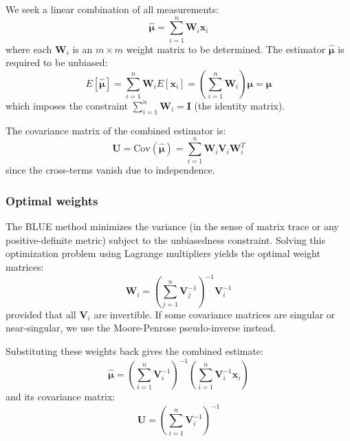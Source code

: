 We seek a linear combination of all measurements:
\begin{equation}
    \hat{\boldsymbol{\mu}} = \sum_{i=1}^{n} \mathbf{W}_i \mathbf{x}_i
\end{equation}
where each $\mathbf{W}_i$ is an $m \times m$ weight matrix to be determined. The estimator $\hat{\boldsymbol{\mu}}$ is required to be unbiased:
\begin{equation}
    E[\hat{\boldsymbol{\mu}}] = \sum_{i=1}^{n} \mathbf{W}_i E[\mathbf{x}_i] = \left( \sum_{i=1}^{n} \mathbf{W}_i \right) \boldsymbol{\mu} = \boldsymbol{\mu}
\end{equation}
which imposes the constraint $\sum_{i=1}^{n} \mathbf{W}_i = \mathbf{I}$ (the identity matrix).

The covariance matrix of the combined estimator is:
\begin{equation}
    \mathbf{U} = \text{Cov}(\hat{\boldsymbol{\mu}}) = \sum_{i=1}^{n} \mathbf{W}_i \mathbf{V}_i \mathbf{W}_i^T
\end{equation}
since the cross-terms vanish due to independence.

\subsubsection{Optimal weights}

The BLUE method minimizes the variance (in the sense of matrix trace or any positive-definite metric) subject to the unbiasedness constraint. Solving this optimization problem using Lagrange multipliers yields the optimal weight matrices:
\begin{equation}
    \mathbf{W}_i = \left( \sum_{j=1}^{n} \mathbf{V}_j^{-1} \right)^{-1} \mathbf{V}_i^{-1}
\end{equation}
provided that all $\mathbf{V}_i$ are invertible. If some covariance matrices are singular or near-singular, we use the Moore-Penrose pseudo-inverse instead.

Substituting these weights back gives the combined estimate:
\begin{equation}
    \hat{\boldsymbol{\mu}} = \left( \sum_{i=1}^{n} \mathbf{V}_i^{-1} \right)^{-1} \left( \sum_{i=1}^{n} \mathbf{V}_i^{-1} \mathbf{x}_i \right)
    \label{eq:blue_estimate}
\end{equation}
and its covariance matrix:
\begin{equation}
    \mathbf{U} = \left( \sum_{i=1}^{n} \mathbf{V}_i^{-1} \right)^{-1}
    \label{eq:blue_covariance}
\end{equation}

